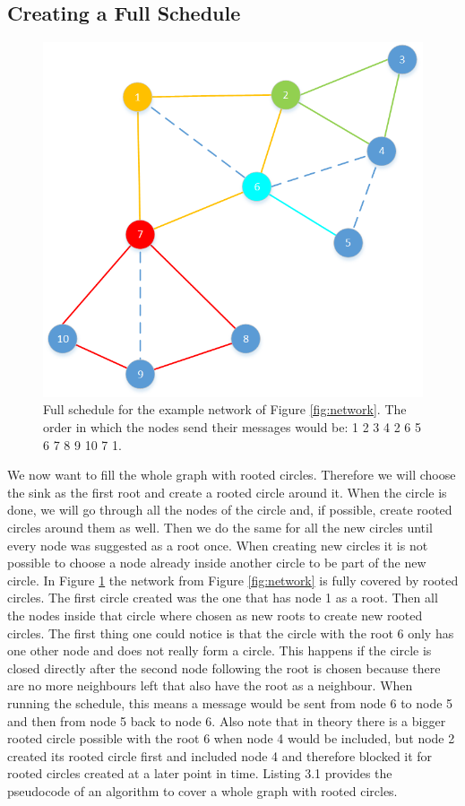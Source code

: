 \subsection{Creating a Full Schedule}
\begin{figure}[htbp]
	\centering         
    \includegraphics[scale=0.6]{content/images/Schedule/FullSchedule}
    \caption{Full schedule for the example network of Figure \ref{fig:network}. The order in which the nodes send their messages would be: 1 2 3 4 2 6 5 6 7 8 9 10 7 1.}
    \label{fig:schedule}
\end{figure} 
We now want to fill the whole graph with rooted circles. Therefore we will choose the sink as the first root and create a rooted circle around it. When the circle is done, we will go through all the nodes of the circle and, if possible, create rooted circles around them as well. Then we do the same for all the new circles until every node was suggested as a root once. When creating new circles it is not possible to choose a node already inside another circle to be part of the new circle. In Figure \ref{fig:schedule} the network from Figure \ref{fig:network} is fully covered by rooted circles. The first circle created was the one that has node 1 as a root. Then all the nodes inside that circle where chosen as new roots to create new rooted circles. The first thing one could notice is that the circle with the root 6 only has one other node and does not really form a circle. This happens if the circle is closed directly after the second node following the root is chosen because there are no more neighbours left that also have the root as a neighbour. When running the schedule, this means a message would be sent from node 6 to node 5 and then from node 5 back to node 6. Also note that in theory there is a bigger rooted circle possible with the root 6 when node 4 would be included, but node 2 created its rooted circle first and included node 4 and therefore blocked it for rooted circles created at a later point in time. Listing 3.1 provides the pseudocode of an algorithm to cover a whole graph with rooted circles.

